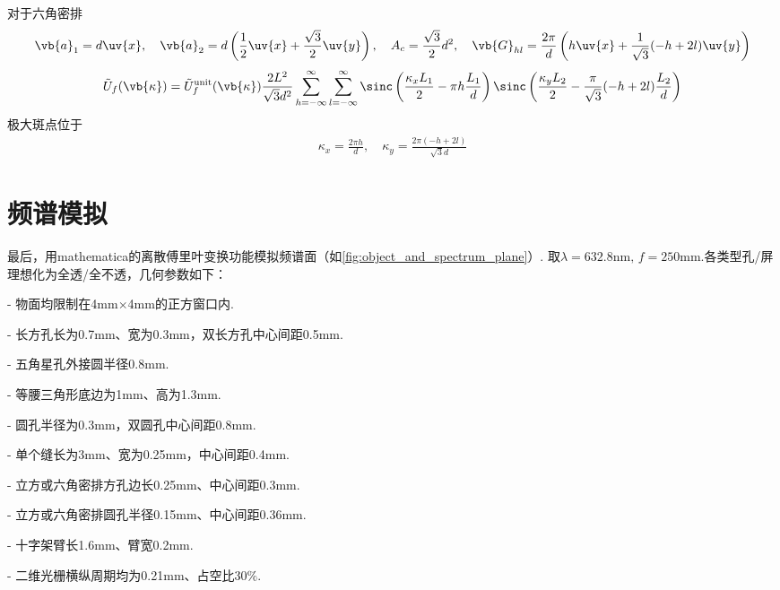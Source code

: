 \begin{exbox}
	对于六角密排
	\begin{align*}
		\vb{a}_1 = d \uv{x}, \quad \vb{a}_2 = d \left( \frac{1}{2} \uv{x} + \frac{\sqrt{3}}{2} \uv{y} \right), \quad A_c = \frac{\sqrt{3}}{2} d^2, \quad \vb{G}_{hl} = \frac{2\pi}{d} \left( h \uv{x} + \frac{1}{\sqrt{3}} (-h + 2l) \uv{y} \right)
	\end{align*}
	\begin{align*}
		\tilde{U}_f(\vb{\kappa}) = \tilde{U}_f^{\text{unit}}(\vb{\kappa}) \frac{2 L^2}{\sqrt{3} d^2} \sum_{h=-\infty}^{\infty} \sum_{l=-\infty}^{\infty} \sinc\left( \frac{\kappa_x L_1}{2} - \pi h \frac{L_1}{d} \right) \sinc\left( \frac{\kappa_y L_2}{2} - \frac{\pi}{\sqrt{3}} (-h + 2l) \frac{L_2}{d} \right)
	\end{align*}
	极大斑点位于
	\begin{align*}
		\kappa_x=\frac{2\pi h}{d},\quad \kappa_y=\frac{2\pi(-h+2l)}{\sqrt{3}d}
	\end{align*}
\end{exbox}

\section{频谱模拟}
最后，用mathematica的离散傅里叶变换功能模拟频谱面（如\cref{fig:object_and_spectrum_plane}）.
取\(\lambda=632.8\text{nm},\,f=250\text{mm}\).各类型孔/屏理想化为全透/全不透，几何参数如下：

- 物面均限制在4mm\(\times\)4mm的正方窗口内.

- 长方孔长为0.7mm、宽为0.3mm，双长方孔中心间距0.5mm.

- 五角星孔外接圆半径0.8mm.

- 等腰三角形底边为1mm、高为1.3mm.

- 圆孔半径为0.3mm，双圆孔中心间距0.8mm.

- 单个缝长为3mm、宽为0.25mm，中心间距0.4mm.

- 立方或六角密排方孔边长0.25mm、中心间距0.3mm.

- 立方或六角密排圆孔半径0.15mm、中心间距0.36mm.

- 十字架臂长1.6mm、臂宽0.2mm.

- 二维光栅横纵周期均为0.21mm、占空比30\(\%\).


